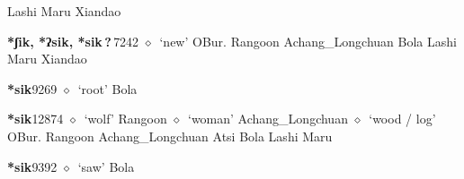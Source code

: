 \begin{list}{}{\leftmargin=1.5em \itemindent=-1.5em}
\hspace{1ex}
         Lashi 
\hspace{1ex}
         Maru 
\hspace{1ex}
         Xiandao 
  \item {\footnotesize \textbf{*ʃik, *ʔsik, *sik\,?\,}}{\tiny 7242}
\hspace{1ex}
         $\diamond$~`new'
         OBur. 
\hspace{1ex}
         Rangoon 
\hspace{1ex}
         Achang\_Longchuan 
\hspace{1ex}
         Bola 
\hspace{1ex}
         Lashi 
\hspace{1ex}
         Maru 
\hspace{1ex}
         Xiandao 
  \item {\footnotesize \textbf{*sik}}{\tiny 9269}
\hspace{1ex}
         $\diamond$~`root'
         Bola 
  \item {\footnotesize \textbf{*sik}}{\tiny 12874}
\hspace{1ex}
         $\diamond$~`wolf'
         Rangoon 
\hspace{1ex}
         $\diamond$~`woman'
         Achang\_Longchuan 
\hspace{1ex}
         $\diamond$~`wood / log'
         OBur. 
\hspace{1ex}
         Rangoon 
\hspace{1ex}
         Achang\_Longchuan 
\hspace{1ex}
         Atsi 
\hspace{1ex}
         Bola 
\hspace{1ex}
         Lashi 
\hspace{1ex}
         Maru 
  \item {\footnotesize \textbf{*sik}}{\tiny 9392}
\hspace{1ex}
         $\diamond$~`saw'
         Bola 
  \end{list}
